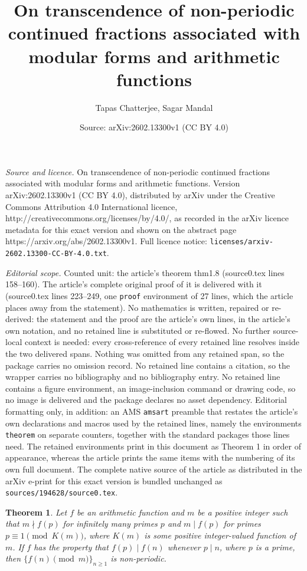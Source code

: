 \documentclass[10pt,a4paper]{amsart}
\title{On transcendence of non-periodic continued fractions associated with modular forms and arithmetic functions}
\author{Tapas Chatterjee, Sagar Mandal}
\date{Source: arXiv:2602.13300v1 (CC BY 4.0)}
\newtheorem{theorem}{Theorem}
\begin{document}
\maketitle

\noindent\emph{Source and licence.} On transcendence of non-periodic continued fractions associated with modular forms and arithmetic functions. Version arXiv:2602.13300v1 (CC BY 4.0), distributed by arXiv under the Creative Commons Attribution 4.0 International licence, http://creativecommons.org/licenses/by/4.0/, as recorded in the arXiv licence metadata for this exact version and shown on the abstract page https://arxiv.org/abs/2602.13300v1. Full licence notice: \texttt{licenses/arxiv-2602.13300-CC-BY-4.0.txt}.\par\smallskip

\noindent\textit{Editorial scope.} Counted unit: the article's theorem thm1.8 (source0.tex lines 158--160). The article's complete original proof of it is delivered with it (source0.tex lines 223--249, one \texttt{proof} environment of 27 lines, which the article places away from the statement). No mathematics is written, repaired or re-derived: the statement and the proof are the article's own lines, in the article's own notation, and no retained line is substituted or re-flowed.  No further source-local context is needed: every cross-reference of every retained line resolves inside the two delivered spans.  Nothing was omitted from any retained span, so the package carries no omission record.  No retained line contains a citation, so the wrapper carries no bibliography and no bibliography entry.  No retained line contains a figure environment, an image-inclusion command or drawing code, so no image is delivered and the package declares no asset dependency.  Editorial formatting only, in addition: an AMS \texttt{amsart} preamble that restates the article's own declarations and macros used by the retained lines, namely the environments \texttt{theorem} on separate counters, together with the standard packages those lines need.  The retained environments print in this document as Theorem 1 in order of appearance, whereas the article prints the same items with the numbering of its own full document.  The complete native source of the article as distributed in the arXiv e-print for this exact version is bundled unchanged as \texttt{sources/194628/source0.tex}.
\begin{theorem}\label{thm1.8}
 Let $f$ be an arithmetic function and $m$ be a positive integer such that $m\nmid f(p)$ for infinitely many primes $p$ and $m\mid f(p)$ for primes $p\equiv 1 \pmod{K(m)}$, where $K(m)$ is some positive integer-valued function of $m$. If $f$  has the property that $f(p)\mid f(n)$ whenever $p\mid n$, where $p$ is a prime, then $\{f(n) \pmod{m}\}_{n\geq1}$ is non-periodic.   
\end{theorem}
\end{document}
